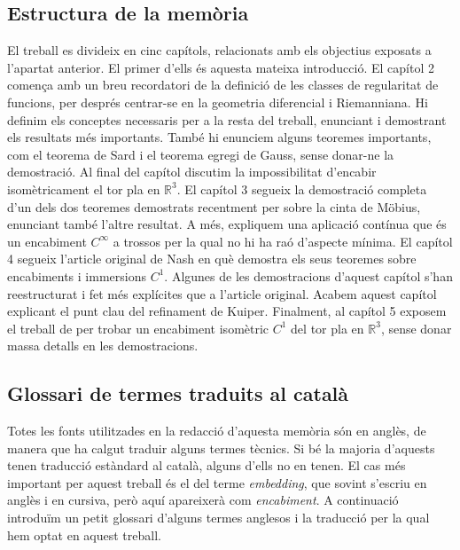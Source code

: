 \subsection*{Estructura de la mem\`oria}
El treball es divideix en cinc capítols, relacionats amb els objectius exposats a l'apartat anterior. El primer d'ells és aquesta mateixa introducció. El capítol 2 comença amb un breu recordatori de la definició de les classes de regularitat de funcions, per després centrar-se en la geometria diferencial i Riemanniana. Hi definim els conceptes necessaris per a la resta del treball, enunciant i demostrant els resultats més importants. També hi enunciem alguns teoremes importants, com el teorema de Sard i el teorema egregi de Gauss, sense donar-ne la demostració. Al final del capítol discutim la impossibilitat d'encabir isomètricament el tor pla en $\mathbb R^3$. El capítol 3 segueix la demostració completa d'un dels dos teoremes demostrats recentment per \cite{schwartz2024} sobre la cinta de Möbius, enunciant també l'altre resultat. A més, expliquem una aplicació contínua que és un encabiment $C^\infty$ a trossos per la qual no hi ha raó d'aspecte mínima. El capítol 4 segueix l'article original de Nash en què demostra els seus teoremes sobre encabiments i immersions $C^1$. Algunes de les demostracions d'aquest capítol s'han reestructurat i fet més explícites que a l'article original. Acabem aquest capítol explicant el punt clau del refinament de Kuiper. Finalment, al capítol 5 exposem el treball de \cite{borrelli2013} per trobar un encabiment isomètric $C^1$ del tor pla en $\mathbb R^3$, sense donar massa detalls en les demostracions. 
\subsection*{Glossari de termes traduits al català}
Totes les fonts utilitzades en la redacció d'aquesta memòria són en anglès, de manera que ha calgut traduir alguns termes tècnics. Si bé la majoria d'aquests tenen traducció estàndard al català, alguns d'ells no en tenen. El cas més important per aquest treball és el del terme \textit{embedding}, que sovint s'escriu en anglès i en cursiva, però aquí apareixerà com \textit{encabiment}. A continuació introduïm un petit glossari d'alguns termes anglesos i la traducció per la qual hem optat en aquest treball. 

